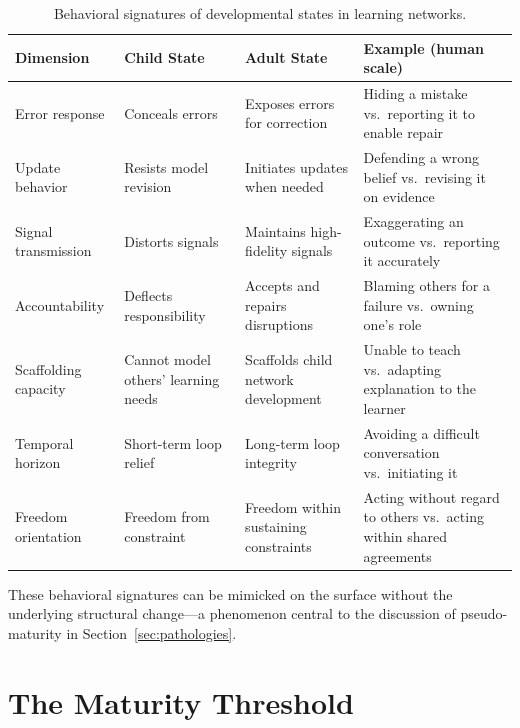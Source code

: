 \documentclass[11pt]{article}
\begin{document}
\begin{table}[h]
\centering
\small
\begin{tabular}{>{\raggedright}p{2.8cm}
                >{\raggedright}p{3.0cm}
                >{\raggedright}p{3.0cm}
                >{\raggedright\arraybackslash}p{3.6cm}}
\toprule
\textbf{Dimension} & \textbf{Child State} & \textbf{Adult State} & \textbf{Example (human scale)} \\
\midrule
Error response
  & Conceals errors
  & Exposes errors for correction
  & Hiding a mistake vs.\ reporting it to enable repair \\[4pt]
Update behavior
  & Resists model revision
  & Initiates updates when needed
  & Defending a wrong belief vs.\ revising it on evidence \\[4pt]
Signal transmission
  & Distorts signals
  & Maintains high-fidelity signals
  & Exaggerating an outcome vs.\ reporting it accurately \\[4pt]
Accountability
  & Deflects responsibility
  & Accepts and repairs disruptions
  & Blaming others for a failure vs.\ owning one's role \\[4pt]
Scaffolding capacity
  & Cannot model others' learning needs
  & Scaffolds child network development
  & Unable to teach vs.\ adapting explanation to the learner \\[4pt]
Temporal horizon
  & Short-term loop relief
  & Long-term loop integrity
  & Avoiding a difficult conversation vs.\ initiating it \\[4pt]
Freedom orientation
  & Freedom from constraint
  & Freedom within sustaining constraints
  & Acting without regard to others vs.\ acting within shared agreements \\
\bottomrule
\end{tabular}
\caption{Behavioral signatures of developmental states in learning networks.}
\label{tab:signatures}
\end{table}

These behavioral signatures can be mimicked on the surface without the underlying structural
change---a phenomenon central to the discussion of pseudo-maturity in
Section~\ref{sec:pathologies}.

\section{The Maturity Threshold}
\end{document}
